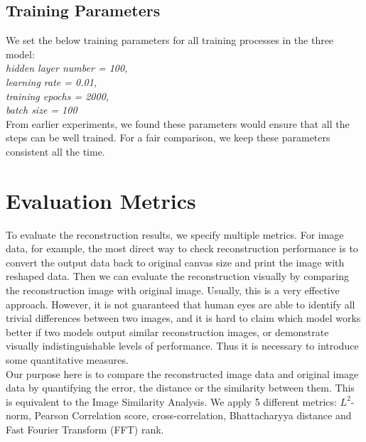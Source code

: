 \documentclass[12pt]{report} %
\begin{document}
\subsection{Training Parameters}
We set the below training parameters for all training processes in the three model:\\
\textit{hidden layer number = 100, \\
	learning rate = 0.01, \\
	training epochs = 2000, \\
	batch size = 100}\\
From earlier experiments, we found these parameters would ensure that all the steps can be well trained. For a fair comparison, we keep these parameters consistent all the time.

\section{Evaluation Metrics}
To evaluate the reconstruction results, we specify multiple metrics. For image data, for example, the most direct way to check reconstruction performance is to convert the output data back to original canvas size and print the image with reshaped data. Then we can evaluate the reconstruction visually by comparing the reconstruction image with original image. Usually, this is a very effective approach. However, it is not guaranteed that human eyes are able to identify all trivial differences between two images, and it is hard to claim which model works better if two models output similar reconstruction images, or demonstrate visually indistinguishable levels of performance. Thus it is necessary to introduce some quantitative measures. \\
Our purpose here is to compare the reconstructed image data and original image data by quantifying the error, the distance or the similarity between them. This is equivalent to the Image Similarity Analysis\cite{PCC, CC, ISA}. We apply 5 different metrics: $L^2$-norm\cite{NORM}, Pearson Correlation score\cite{PCC}, cross-correlation\cite{CC}, Bhattacharyya distance\cite{ISA} and Fast Fourier Transform (FFT) rank\cite{ISA}.
\end{document}
